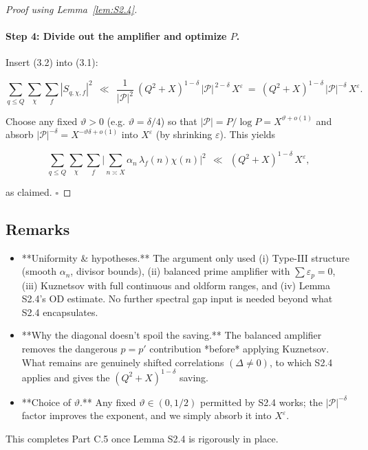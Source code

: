 \documentclass[11pt]{article}
\theoremstyle{definition}
\theoremstyle{remark}
\begin{document}
\begin{proof}[Proof using Lemma~\ref{lem:S2.4}]
	\paragraph{Step 4: Divide out the amplifier and optimize $P$.}
	Insert (3.2) into (3.1):

	$$
		\sum_{q\le Q}\sum_{\chi}\sum_f |S_{q,\chi,f}|^2
		\ \ \ll\ \ \frac{1}{|\mathcal P|^2}\ (Q^2+X)^{1-\delta}\,|\mathcal P|^{\,2-\delta}\,X^{\varepsilon}
		\ =\ (Q^2+X)^{1-\delta}\,|\mathcal P|^{-\delta}\,X^{\varepsilon}.
	$$

	Choose any fixed $\vartheta>0$ (e.g. $\vartheta=\delta/4$) so that $|\mathcal P|=P/\log P=X^{\vartheta+o(1)}$ and absorb $|\mathcal P|^{-\delta}=X^{-\vartheta\delta+o(1)}$ into $X^{\varepsilon}$ (by shrinking $\varepsilon$). This yields

	$$
		\sum_{q\le Q}\sum_{\chi}\sum_f \Big|\sum_{n\asymp X}\alpha_n\,\lambda_f(n)\chi(n)\Big|^2
		\ \ \ll\ \ (Q^2+X)^{1-\delta}\,X^{\varepsilon},
	$$

	as claimed. $\square$

\end{proof}

\subsection*{Remarks}

\begin{itemize}
	\item **Uniformity \& hypotheses.** The argument only used (i) Type-III structure (smooth $\alpha_n$, divisor bounds), (ii) balanced prime amplifier with $\sum \varepsilon_p=0$, (iii) Kuznetsov with full continuous and oldform ranges, and (iv) Lemma S2.4’s OD estimate. No further spectral gap input is needed beyond what S2.4 encapsulates.

	\item **Why the diagonal doesn’t spoil the saving.** The balanced amplifier removes the dangerous $p=p'$ contribution *before* applying Kuznetsov. What remains are genuinely shifted correlations $(\Delta\neq 0)$, to which S2.4 applies and gives the $(Q^2+X)^{1-\delta}$ saving.

	\item **Choice of $\vartheta$.** Any fixed $\vartheta\in(0,1/2)$ permitted by S2.4 works; the $|\mathcal P|^{-\delta}$ factor improves the exponent, and we simply absorb it into $X^{\varepsilon}$.
\end{itemize}

This completes Part C.5 once Lemma S2.4 is rigorously in place.
\end{document}
